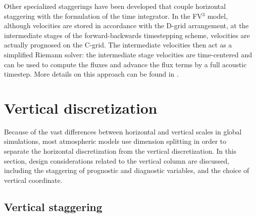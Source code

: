 \documentclass[gmd, manuscript]{copernicus}
\begin{document}

Other specialized staggerings have been developed that couple horizontal staggering with the formulation of the time integrator.  In the FV$^3$ model, although velocities are stored in accordance with the D-grid arrangement, at the intermediate stages of the forward-backwards timestepping scheme, velocities are actually prognosed on the C-grid.  The intermediate velocities then act as a simplified Riemann solver:  the intermediate stage velocities are time-centered and can be used to compute the fluxes and advance the flux terms by a full acoustic timestep.  More details on this approach can be found in \cite{LR1997QJR}.


\section{Vertical discretization} \label{sec:VerticalDiscretization}


Because of the vast differences between horizontal and vertical scales in global simulations, most atmospheric models use dimension splitting in order to separate the horizontal discretization from the vertical discretization.  In this section, design considerations related to the vertical column are discussed, including the staggering of prognostic and diagnostic variables, and the choice of vertical coordinate.

\subsection{Vertical staggering} \label{sec:VerticalStaggering}
\end{document}
